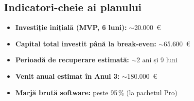 \subsection*{Indicatori-cheie ai planului}
\begin{itemize}
    \item \textbf{Investiție inițială (MVP, 6 luni):} $\sim$20.000~\euro
    \item \textbf{Capital total investit până la break-even:} $\sim$65.600~\euro
    \item \textbf{Perioadă de recuperare estimată:} $\sim$2 ani și 9 luni
    \item \textbf{Venit anual estimat în Anul 3:} $\sim$180.000~\euro
    \item \textbf{Marjă brută software:} peste 95\,\% (la pachetul Pro)
\end{itemize}
